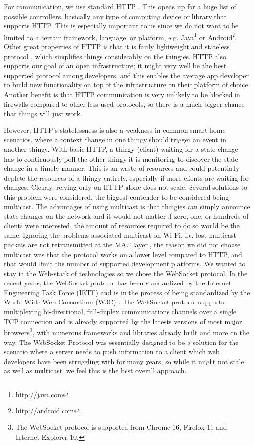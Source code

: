 \documentclass{ubicomp2012}
\begin{document}
For communication, we use standard HTTP \cite{Fielding:1999:HTP:RFC2616}. This opens up for a huge list of possible controllers, basically any type of computing device or library that supports HTTP. This is especially important to us since we do not want to be limited to a certain framework, language, or platform, e.g. Java\footnote{\url{http://java.com}} or Android\footnote{\url{http://android.com}}. Other great properties of HTTP is that it is fairly lightweight and stateless protocol \cite{Fielding:1999:HTP:RFC2616}, which simplifies things considerably on the thingies. HTTP also supports our goal of an open infrastructure; it might very well be the best supported protocol among developers, and this enables the average app developer to build new functionality on top of the infrastructure on their platform of choice. Another benefit is that HTTP communication is very unlikely to be blocked in firewalls compared to other less used protocols, so there is a much bigger chance that things will just work.

However, HTTP's statelessness is also a weakness in common smart home scenarios, where a context change in one thingy should trigger an event in another thingy. With basic HTTP, a thingy (client) waiting for a state change has to continuously poll the other thingy it is monitoring to discover the state change in a timely manner. This is an waste of resources and could potentially deplete the resources of a thingy entirely, especially if more clients are waiting for changes. Clearly, relying only on HTTP alone does not scale. Several solutions to this problem were considered, the biggest contender to be considered being multicast. The advantages of using multicast is that thingies can simply announce state changes on the network and it would not matter if zero, one, or hundreds of clients were interested, the amount of resources required to do so would be the same. Ignoring the problems associated multicast on Wi-Fi, i.e. lost multicast packets are not retransmitted at the MAC layer \cite{conf/icnp/ChandraKMNPRR09}, the reason we did not choose multicast was that the protocol works on a lower level compared to HTTP, and that would limit the number of supported development platforms. We wanted to stay in the Web-stack of technologies so we chose the WebSocket protocol. In the recent years, the WebSocket protocol has been standardized by the Internet Engineering Task Force (IETF) \cite{IETFWebsockets} and is in the process of being standardized by the World Wide Web Consortium (W3C) \cite{w3cWebsockets}. The WebSocket protocol supports multiplexing bi-directional, full-duplex communications channels over a single TCP connection and is already supported by the latests versions of most major browsers\footnote{The WebSocket protocol is supported from Chrome 16, Firefox 11 and Internet Explorer 10.}, with numerous frameworks and libraries already built and more on the way. The WebSocket Protocol was essentially designed to be a solution for the scenario where a server needs to push information to a client\cite{IETFWebsockets} which web developers have been struggling with for many years, so while it might not scale as well as multicast, we feel this is the best overall approach.
\end{document}
